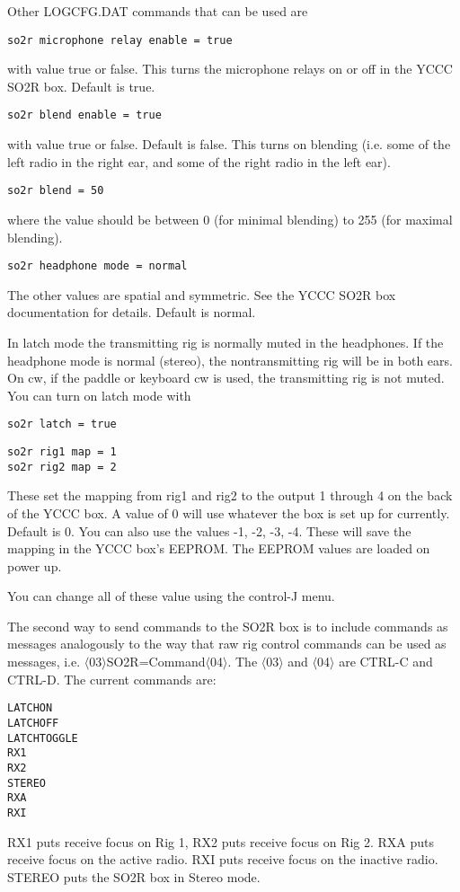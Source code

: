 \documentclass[12pt]{article}
\begin{document}
Other LOGCFG.DAT commands that can be used
are
\begin{verbatim}
so2r microphone relay enable = true
\end{verbatim}
with value true or false. This turns the microphone relays on or off
in the YCCC SO2R box. Default is true.

\begin{verbatim}
so2r blend enable = true
\end{verbatim}
with
value true or false. Default is false. This turns on blending (i.e.
some of the left radio in the right ear, and some of the right radio
in the left ear).

\begin{verbatim}
so2r blend = 50
\end{verbatim}
where
the value should be between 0 (for minimal blending) to 255
(for maximal blending).

\begin{verbatim}
so2r headphone mode = normal
\end{verbatim}
The other values are spatial and symmetric. See the YCCC SO2R box documentation
for details. Default is normal.


In latch mode the transmitting rig is normally muted in the headphones.
If the headphone mode is normal (stereo), the nontransmitting rig
will be in both ears. On cw, if the paddle or keyboard cw is used, the
transmitting rig is not muted. You can turn on latch mode with
\begin{verbatim}
so2r latch = true
\end{verbatim}

\begin{verbatim}
so2r rig1 map = 1
so2r rig2 map = 2
\end{verbatim}

These set the mapping from rig1 and rig2 to the output 1 through 4 on
the back of the YCCC box. A value of 0 will use whatever the box is
set up for currently. Default is 0.
You can also use the values -1, -2, -3, -4. These will save the mapping
in the YCCC box's EEPROM. The EEPROM values are loaded on power up.

You can change all of these value using the control-J menu.

The second way to send commands to the SO2R box is to
include commands as messages analogously to the way that
raw rig control commands can be used as messages, i.e.
$\langle$03$\rangle$SO2R=Command$\langle$04$\rangle$.
The $\langle$03$\rangle$ and $\langle$04$\rangle$  are CTRL-C and CTRL-D.
The current commands are:
\begin{verbatim}
LATCHON
LATCHOFF
LATCHTOGGLE
RX1
RX2
STEREO
RXA
RXI
\end{verbatim}
RX1
puts receive focus on Rig 1, RX2 puts receive focus on Rig 2.
RXA puts receive focus on the active radio.
RXI puts receive focus on the inactive radio.
STEREO puts the SO2R box in Stereo mode. 
\end{document}

